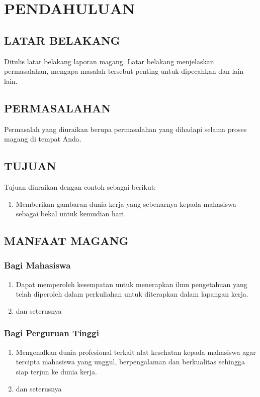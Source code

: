 \chapter{PENDAHULUAN}
\label{chap:pendahuluan}

\paragraphtextstyle

\section{LATAR BELAKANG}
\label{sec:latarbelakang}

Ditulis latar belakang laporan magang. Latar belakang menjelaskan permasalahan, mengapa masalah tersebut penting untuk dipecahkan dan lain-lain.

\section{PERMASALAHAN}
\label{sec:permasalahan}

Permasalah yang diuraikan berupa permasalahan yang dihadapi selama proses magang di tempat Anda.

\section{TUJUAN}
\label{sec:tujuan}

Tujuan diuraikan dengan contoh sebagai berikut:
\begin{enumerate}[label=\alph*.]
  \item Memberikan gambaran dunia kerja yang sebenarnya kepada mahasiswa sebagai bekal untuk kemudian hari.
\end{enumerate}

\section{MANFAAT MAGANG}
\label{sec:manfaat}

\subsection{Bagi Mahasiswa}
\begin{enumerate}[label=\alph*.]
  \item Dapat memperoleh kesempatan untuk menerapkan ilmu pengetahuan yang telah diperoleh dalam perkuliahan untuk diterapkan dalam lapangan kerja.
  \item dan seterusnya
\end{enumerate}

\subsection{Bagi Perguruan Tinggi}
\begin{enumerate}[label=\alph*.]
  \item Mengenalkan dunia profesional terkait alat kesehatan kepada mahasiswa agar tercipta mahasiswa yang unggul, berpengalaman dan berkualitas sehingga siap terjun ke dunia kerja.
  \item dan seterusnya
\end{enumerate}

